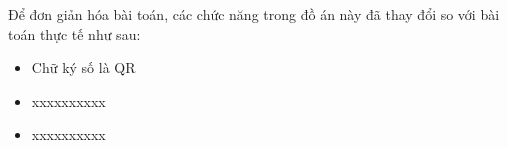 Để đơn giản hóa bài toán, các chức năng trong đồ án này đã thay đổi so với bài toán thực tế như sau:

\begin{itemize}

\item Chữ ký số là QR

\item xxxxxxxxxx

\item xxxxxxxxxx

\end{itemize}
